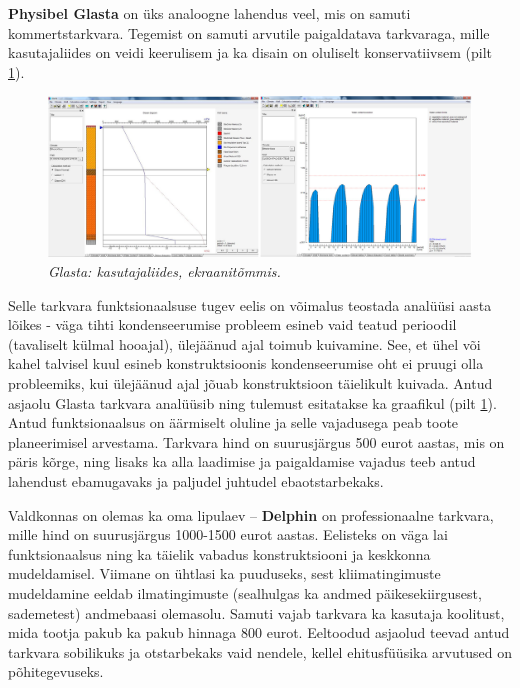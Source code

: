 \textbf{Physibel Glasta} on üks analoogne lahendus veel, mis on samuti kommertstarkvara. Tegemist on samuti arvutile paigaldatava tarkvaraga, mille
kasutajaliides on veidi keerulisem ja ka disain on oluliselt konservatiivsem (pilt \ref{fig:glasta_sample}). 
\begin{figure}[ht]
    \centering
    \includegraphics[width=1\textwidth]{figures/problem_statement/09_glasta_sample.png}
    \caption[Physibel Glasta kasutajaliides, ekraanitõmmis]{\textit{Glasta: kasutajaliides, ekraanitõmmis.}}
    \label{fig:glasta_sample}
\end{figure}

Selle tarkvara funktsionaalsuse tugev eelis on võimalus teostada analüüsi aasta lõikes - väga tihti 
kondenseerumise probleem esineb vaid teatud perioodil (tavaliselt külmal hooajal),
ülejäänud ajal toimub kuivamine. See, et ühel või kahel talvisel kuul esineb konstruktsioonis kondenseerumise oht ei pruugi
olla probleemiks, kui ülejäänud ajal jõuab konstruktsioon täielikult kuivada. Antud asjaolu Glasta tarkvara analüüsib ning 
tulemust esitatakse ka graafikul (pilt \ref{fig:glasta_sample}). Antud funktsionaalsus on äärmiselt oluline ja selle vajadusega peab toote 
planeerimisel arvestama. Tarkvara hind on suurusjärgus 500 eurot aastas, mis on päris kõrge, ning lisaks ka alla laadimise ja 
paigaldamise vajadus teeb antud lahendust ebamugavaks ja paljudel juhtudel ebaotstarbekaks.

Valdkonnas on olemas ka oma lipulaev -- \textbf{Delphin} on professionaalne tarkvara, mille hind on suurusjärgus 1000-1500 eurot aastas.
Eelisteks on väga lai funktsionaalsus ning ka täielik vabadus konstruktsiooni ja keskkonna mudeldamisel. Viimane on ühtlasi ka puuduseks,
sest kliimatingimuste mudeldamine eeldab ilmatingimuste (sealhulgas ka andmed päikesekiirgusest, sademetest) andmebaasi olemasolu.
Samuti vajab tarkvara ka kasutaja koolitust, mida tootja pakub ka pakub hinnaga 800 eurot. Eeltoodud asjaolud teevad antud tarkvara 
sobilikuks ja otstarbekaks vaid nendele, kellel ehitusfüüsika arvutused on põhitegevuseks.
